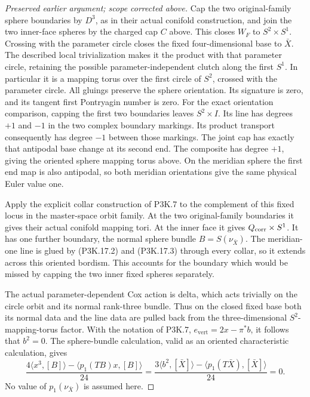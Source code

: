 \begin{proof}[Preserved earlier argument; scope corrected above]
Cap the two original-family sphere boundaries by \(D^3\),
as in their actual conifold construction, and join the two
inner-face spheres by the charged cap \(C\) above.  This
closes \(W_F\) to \(S^2\times S^1\).  Crossing with
the parameter circle closes the fixed four-dimensional base
to \(\bar X\).  The described local trivialization makes
it the product with that parameter circle, retaining the
possible parameter-independent clutch along the first
\(S^1\).  In particular it is a mapping torus over the
first circle of \(S^2\), crossed with the parameter circle.
All gluings preserve the sphere orientation.  Its signature
is zero, and its tangent first Pontryagin number is zero.
For the exact orientation comparison, capping the first two
boundaries leaves \(S^2\times I\).  Its line has degrees
\(+1\) and \(-1\) in the two complex boundary markings.
Its product transport consequently has degree \(-1\)
between those markings.  The joint cap has exactly that
antipodal base change at its second end.  The composite has
degree \(+1\), giving the oriented sphere mapping torus
above.  On the meridian sphere the first end map is also
antipodal, so both meridian orientations give the same
physical Euler value one.

Apply the explicit collar construction of P3K.7 to the
complement of this fixed locus in the master-space orbit
family.  At the two original-family boundaries it gives
their actual conifold mapping tori.  At the inner face it
gives \(Q_{\rm corr}\times S^1\).  It has one further
boundary, the normal sphere bundle \(B=S(\nu_{\bar X})\).
The meridian-one line is glued by (P3K.17.2) and (P3K.17.3)
through every collar, so it extends across this oriented
bordism.  This accounts for the boundary which would be
missed by capping the two inner fixed spheres separately.

The actual parameter-dependent Cox action is delta, which
acts trivially on the circle orbit and its normal rank-three
bundle.  Thus on the closed fixed base both its normal data
and the line data are pulled back from the three-dimensional
\(S^2\)-mapping-torus factor.  With the notation of P3K.7,
\(e_{\mathrm{vert}}=2x-\pi^*b\), it follows that
\(b^2=0\).  The sphere-bundle calculation, valid as an
oriented characteristic calculation, gives
\[
       \frac{4\langle x^3,[B]\rangle
                  -\langle p_1(TB)x,[B]\rangle}{24}
       =\frac{3\langle b^2,[\bar X]\rangle
                    -\langle p_1(T\bar X),[\bar X]\rangle}{24}
       =0.                                             \tag{P3K.17.5}
\]
No value of \(p_1(\nu_{\bar X})\) is assumed here.


\end{proof}
